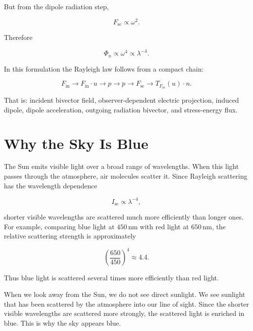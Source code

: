 \documentclass[11pt,a4paper]{article}
\begin{document}
But from the dipole radiation step,

\begin{equation}
F_{\mathrm{sc}}\propto \omega^2.
\end{equation}

Therefore

\begin{equation}
\Phi_n
\propto
\omega^4
\propto
\lambda^{-4}.
\end{equation}

In this formulation the Rayleigh law follows from a compact chain:

\begin{equation}
F_{\mathrm{in}}
\longrightarrow
F_{\mathrm{in}}\cdot u
\longrightarrow
p
\longrightarrow
\ddot{p}
\longrightarrow
F_{\mathrm{sc}}
\longrightarrow
T_{F_{\mathrm{sc}}}(u)\cdot n.
\end{equation}

That is: incident bivector field, observer-dependent electric projection,
induced dipole, dipole acceleration, outgoing radiation bivector, and
stress-energy flux.

\section{Why the Sky Is Blue}

The Sun emits visible light over a broad range of wavelengths. When this light
passes through the atmosphere, air molecules scatter it. Since Rayleigh
scattering has the wavelength dependence

\begin{equation}
I_{\mathrm{sc}}\propto \lambda^{-4},
\end{equation}

shorter visible wavelengths are scattered much more efficiently than longer
ones. For example, comparing blue light at \(450\,\mathrm{nm}\) with red light
at \(650\,\mathrm{nm}\), the relative scattering strength is approximately

\begin{equation}
\left(\frac{650}{450}\right)^4 \approx 4.4.
\end{equation}

Thus blue light is scattered several times more efficiently than red light.

When we look away from the Sun, we do not see direct sunlight. We see sunlight
that has been scattered by the atmosphere into our line of sight. Since the
shorter visible wavelengths are scattered more strongly, the scattered light
is enriched in blue. This is why the sky appears blue.
\end{document}
